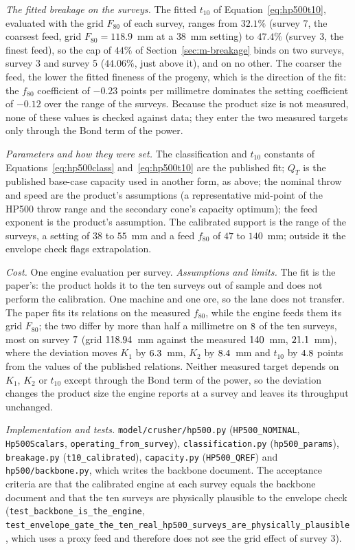 \emph{The fitted breakage on the surveys.} The fitted $t_{10}$ of Equation~\eqref{eq:hp500t10}, evaluated with the grid $F_{80}$ of each
survey, ranges from $32.1\%$ (survey 7, the coarsest feed, grid $F_{80}=118.9$~mm at a $38$~mm setting) to $47.4\%$ (survey 3, the finest
feed), so the cap of $44\%$ of Section~\ref{sec:m-breakage} binds on two surveys, survey 3 and survey 5 ($44.06\%$, just above it), and on no
other. The coarser the feed, the lower the fitted fineness of the progeny, which is the direction of the fit: the $f_{80}$ coefficient
of $-0.23$ points per millimetre dominates the setting coefficient of $-0.12$ over the range of the surveys. Because the product size is not
measured, none of these values is checked against data; they enter the two measured targets only through the Bond term of the power.

\emph{Parameters and how they were set.} The classification and $t_{10}$ constants of Equations~\eqref{eq:hp500class}
and~\eqref{eq:hp500t10} are the published fit; $Q_T$ is the published base-case capacity used in another form, as above; the
nominal throw and speed are the product's assumptions (a representative mid-point of the HP500 throw range and the secondary cone's capacity
optimum); the feed exponent is the product's assumption. The calibrated support is the range of the surveys, a setting of $38$ to $55$~mm and a
feed $f_{80}$ of $47$ to $140$~mm; outside it the envelope check flags extrapolation.

\emph{Cost.} One engine evaluation per survey. \emph{Assumptions and limits.} The fit is the paper's: the product holds it to the ten surveys out
of sample and does not perform the calibration. One machine and one ore, so the lane does not transfer. The paper fits its relations on the
measured $f_{80}$, while the engine feeds them its grid $F_{80}$; the two differ by more than half a millimetre on $8$ of the ten
surveys, most on survey $7$ (grid $118.94$~mm against the measured $140$~mm, $21.1$~mm), where the deviation
moves $K_1$ by $6.3$~mm, $K_2$ by $8.4$~mm and $t_{10}$ by $4.8$ points from the values of the published relations.
Neither measured target depends on $K_1$, $K_2$ or $t_{10}$ except through the Bond term of the power, so the deviation changes the
product size the engine reports at a survey and leaves its throughput unchanged.

\emph{Implementation and tests.} \texttt{model/\allowbreak{}crusher/\allowbreak{}hp500.py} (\texttt{HP500\_NOMINAL}, \texttt{Hp500Scalars}, \texttt{operating\_from\_survey}),
\texttt{classification.py} (\texttt{hp500\_params}), \texttt{breakage.py} (\texttt{t10\_calibrated}), \texttt{capacity.py}
(\texttt{HP500\_QREF}) and \texttt{hp500/\allowbreak{}backbone.py}, which writes the backbone document. The acceptance criteria are that the calibrated engine
at each survey equals the backbone document and that the ten surveys are physically plausible to the envelope check
(\texttt{test\_backbone\_is\_the\_engine}, \texttt{test\_envelope\_gate\_the\_ten\_real\_hp500\_surveys\_are\_physically\_plausible}, which
uses a proxy feed and therefore does not see the grid effect of survey 3).

